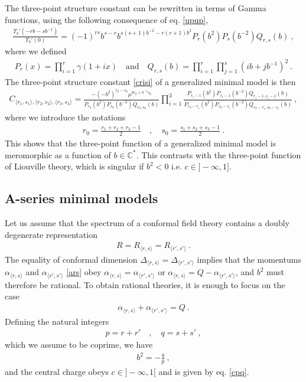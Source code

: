 \documentclass[12pt, a4paper, notitlepage, twoside]{report}
\numberwithin{equation}{section}
\theoremstyle{break}
\begin{document}
The three-point structure constant can be rewritten in terms of Gamma functions, using the following consequence of eq. \eqref{upup},
\begin{align}
 \frac{\Upsilon_b'(-rb-sb^{-1})}{\Upsilon_b'(0)} = (-1)^{rs} b^{s-r} b^{s(s+1)b^{-2}-r(r+1)b^2} P_r(b^2)P_s(b^{-2}) Q_{r,s}(b)\ ,
\end{align}
where we defined
\begin{align}
 P_r(x) = \prod_{i=1}^r \gamma(1+ix) \quad \text{and} \quad Q_{r,s}(b) = \prod_{i=1}^r \prod_{j=1}^s (ib+jb^{-1})^2\ .
\end{align}
The three-point structure constant \eqref{crisi} of a generalized minimal model is then
\begin{align}
 C_{\langle r_1,s_1\rangle ,\langle r_2,s_2\rangle ,\langle r_3,s_3 \rangle} =  \frac{-(-b^2)^{r_0-s_0}\mu^{br_0 + b^{-1}s_0}}{P_{r_0}(b^2)P_{s_0}(b^{-2})Q_{r_0,s_0}(b)} \prod_{i=1}^3 \frac{P_{r_i-1}(b^2)P_{s_i-1}(b^{-2}) Q_{r_i-1,s_i-1}(b)}{P_{r_0-r_i}(b^2)P_{s_0-s_i}(b^{-2}) Q_{r_0-r_i,s_0-s_i}(b)} \ ,
\label{cpqb}
\end{align}
where we introduce the notations 
\begin{align}
 r_0 = \frac{r_1+r_2+r_3-1}{2} \quad , \quad s_0=\frac{s_1+s_2+s_3-1}{2}\ .
\end{align}
This shows that the three-point function of a generalized minimal model is meromorphic as a function of $b\in {\mathbb{C}}^*$.
This contrasts with the three-point function of Liouville theory, which is singular if $b^2 < 0$ i.e. $c\in ]-\infty, 1]$. 


\subsection{A-series minimal models \label{secamm}}

Let us assume that the spectrum of a conformal field theory contains a doubly degenerate representation 
\begin{align}
 R=R_{\langle r,s \rangle}=R_{\langle r',s' \rangle}\ .
\end{align}
The equality of conformal dimension $\Delta_{\langle r,s \rangle}=\Delta_{\langle r',s' \rangle}$ implies that 
the momentums $\alpha_{\langle r,s \rangle}$ and $\alpha_{\langle r',s' \rangle}$ \eqref{ars} obey $\alpha_{\langle r,s \rangle}=\alpha_{\langle r',s' \rangle}$ or $\alpha_{\langle r,s \rangle}=Q-\alpha_{\langle r',s' \rangle}$, and $b^2$ must therefore be rational.
To obtain rational theories, it is enough to focus on the case 
\begin{align}
 \alpha_{\langle r,s \rangle}+\alpha_{\langle r',s' \rangle} = Q\ .
\end{align}
Defining the natural integers 
\begin{align}
 p = r+r' \quad , \quad q = s+s'\ ,
\end{align}
which we assume to be coprime, we have 
\begin{align} 
 \boxed{b^2 = - \frac{q}{p}} \ ,
\end{align}
and the central charge obeys $c\in ]-\infty, 1[$ and is given by eq. \eqref{cpq}.
\end{document}
